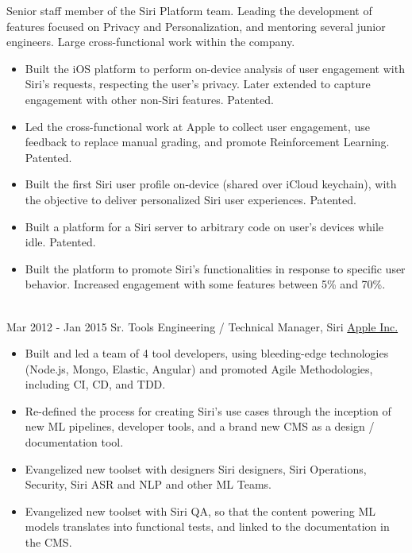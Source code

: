 \documentclass[letterpaper]{twentysecondcv} %
\begin{document}
\begin{twenty}
        {Senior staff member of the Siri Platform team. Leading the development of features focused on Privacy and Personalization, and mentoring several junior engineers. Large cross-functional work within the company.}
        {
        {\begin{itemize}
        \item Built the iOS platform to perform on-device analysis of user engagement with Siri's requests, respecting the user’s privacy. Later extended to capture engagement with other non-Siri features. Patented.
        \item Led the cross-functional work at Apple to collect user engagement, use feedback to replace manual grading, and promote Reinforcement Learning. Patented.
        \item Built the first Siri user profile on-device (shared over iCloud keychain), with the objective to deliver personalized Siri user experiences. Patented.
        \item Built a platform for a Siri server to arbitrary code on user's devices while idle. Patented.
        \item Built the platform to promote Siri's functionalities in response to specific user behavior. Increased engagement with some features between 5\% and 70\%.
        \end{itemize}}
        }
    \\
    \twentyitem
        {Mar 2012 -}
        {Jan 2015}
        {Sr. Tools Engineering / Technical Manager, Siri}
        {\href{http://www.apple.com}{Apple Inc.}}
        {}
        {
        {\begin{itemize}
        \item Built and led a team of 4 tool developers, using bleeding-edge technologies (Node.js, Mongo, Elastic, Angular) and promoted Agile Methodologies, including CI, CD, and TDD.
        \item Re-defined the process for creating Siri's use cases through the inception of new ML pipelines, developer tools, and a brand new CMS as a design / documentation tool.
        \item Evangelized new toolset with designers Siri designers, Siri Operations, Security, Siri ASR and NLP and other ML Teams.
        \item Evangelized new toolset with Siri QA, so that the content powering ML models translates into functional tests, and linked to the documentation in the CMS.

\end{itemize}}}
\end{twenty}
\end{document}
